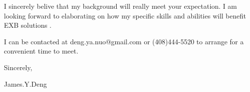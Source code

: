 { \bigbreak } 
I sincerely belive that my background will really meet your expectation.
I am looking forward to elaborating on how my specific skills and abilities will benefit EXB solutions .

{ \bigbreak } 
I can be contacted at deng.ya.nuo@gmail.com
or (408)444-5520 to arrange for a convenient time to meet.

{ \bigbreak } 




\vskip 60pt

{ \bigbreak } 
Sincerely,

James.Y.Deng

\bye
